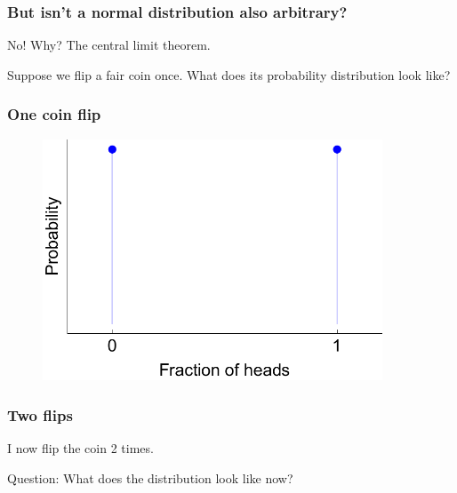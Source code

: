 \documentclass[handout]{beamer}
\begin{document}
\begin{frame}
	\frametitle{But isn't a normal distribution also arbitrary?}
	
	No! Why? The central limit theorem. 
	
	\vspace{0.5cm}
	
	Suppose we flip a fair coin once. What does its probability distribution look like?
	
\end{frame}

\begin{frame}
	\frametitle{One coin flip}
	
	\begin{figure}[ht]
		\centerline{\includegraphics[width=0.9\textwidth]{../figures/binomial_1.pdf}}
	\end{figure}
	
\end{frame}

\begin{frame}
	\frametitle{Two flips}
	I now flip the coin 2 times.
	
	\vspace{0.5cm}
	
	Question: What does the distribution look like now?
	
\end{frame}
\end{document}

